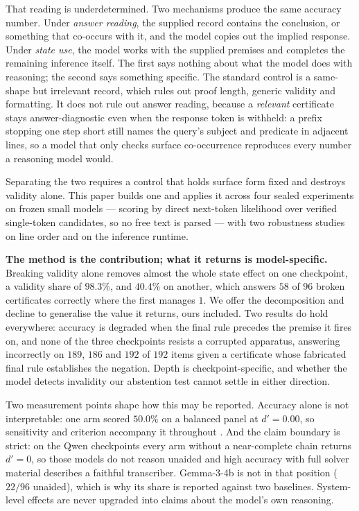\documentclass[10pt,twocolumn]{article}
\begin{document}
That reading is underdetermined. Two mechanisms produce the same accuracy
number. Under \emph{answer reading}, the supplied record contains the
conclusion, or something that co-occurs with it, and the model copies out the
implied response. Under \emph{state use}, the model works with the supplied
premises and completes the remaining inference itself. The first says nothing
about what the model does with reasoning; the second says something specific.
The standard control is a same-shape but irrelevant record, which rules out
proof length, generic validity and formatting. It does not rule out answer
reading, because a \emph{relevant} certificate stays answer-diagnostic even when
the response token is withheld: a prefix stopping one step short still names the
query's subject and predicate in adjacent lines, so a model that only checks
surface co-occurrence reproduces every number a reasoning model would.

Separating the two requires a control that holds surface form fixed and destroys
validity alone. This paper builds one and applies it across four sealed experiments on frozen
small models --- scoring by direct next-token likelihood over verified
single-token candidates, so no free text is parsed --- with two robustness studies
on line order and on the inference runtime.

\textbf{The method is the contribution; what it returns is model-specific.}
Breaking validity alone removes almost the whole state effect on one checkpoint, a validity share of $98.3\%$, and $40.4\%$ on another, which answers $58$
of $96$ broken certificates correctly where the first manages $1$. We offer the
decomposition and decline to generalise the value it returns, ours included.
Two results do hold everywhere: accuracy is degraded when the final rule
precedes the premise it fires on, and none of the three checkpoints resists a
corrupted apparatus, answering incorrectly on $189$, $186$ and $192$ of $192$
items given a certificate whose fabricated final rule establishes the negation.
Depth is checkpoint-specific, and whether the model detects invalidity our
abstention test cannot settle in either direction.

Two measurement points shape how this may be reported. Accuracy alone is not interpretable: one arm scored $50.0\%$ on a balanced panel at $d' = 0.00$, so sensitivity and criterion accompany it throughout
\citep{macmillan1991detection,stanislaw1999calculation}. And the claim boundary
is strict: on the Qwen checkpoints every arm without a near-complete chain
returns $d' = 0$, so those models do not reason unaided and high accuracy with
full solver material describes a faithful transcriber. Gemma-3-4b is not in that
position ($22/96$ unaided), which is why its share is reported against two
baselines. System-level effects are never upgraded into claims about the model's
own reasoning.
\end{document}
